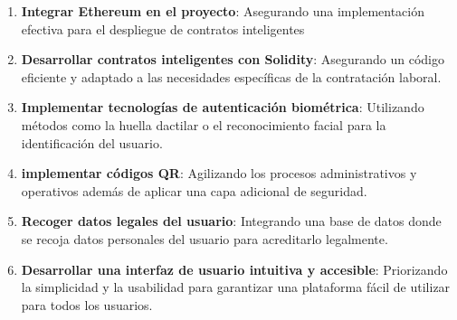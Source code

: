\begin{enumerate}

\item \textbf{Integrar Ethereum en el proyecto}: Asegurando una implementación efectiva para el despliegue de contratos inteligentes

\item \textbf{Desarrollar contratos inteligentes con Solidity}: Asegurando un código eficiente y adaptado a las necesidades específicas de la contratación laboral. 

\item \textbf{Implementar tecnologías de autenticación biométrica}: Utilizando métodos como la huella dactilar o el reconocimiento facial para la identificación del usuario.

\item \textbf{implementar códigos QR}: Agilizando los procesos administrativos y operativos además de aplicar una capa adicional de seguridad.

\item \textbf{Recoger datos legales del usuario}: Integrando una base de datos donde se recoja datos personales del usuario para acreditarlo legalmente.

\item \textbf{Desarrollar una interfaz de usuario intuitiva y accesible}: Priorizando la simplicidad y la usabilidad para garantizar una plataforma fácil de utilizar para todos los usuarios.



\end{enumerate}